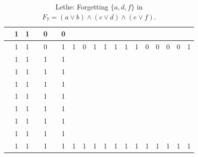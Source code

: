\begin{table}[!tb]
\begin{tabular}{|c|c|c|c|c|c|c|c|c|c|c|c|c|c|c|c|c|c|c|}
        \rowcolor{blue!40}  & 1 & 1 &  & 0 &  & 0 &  &  &  &  &  &  &  &  &  &  &  &  \\ \hline
        \rowcolor{blue!40}  & 1 & 1 &  & 0 &  & 1 & 1 & 0 & 1 & 1 & 1 & 1 & 1 & 0 & 0 & 0 & 0 & 1 \\ \hline
        \rowcolor{red!40}  & 1 & 1 &  & 1 &  & 1 &  &  &  &  &  &  &  &  &  &  &  &  \\ \hline
        \rowcolor{red!40}  & 1 & 1 &  & 1 &  & 1 &  &  &  &  &  &  &  &  &  &  &  &  \\ \hline
        \rowcolor{red!40}  & 1 & 1 &  & 1 &  & 1 &  &  &  &  &  &  &  &  &  &  &  &  \\ \hline
        \rowcolor{red!40}  & 1 & 1 &  & 1 &  & 1 &  &  &  &  &  &  &  &  &  &  &  &  \\ \hline
        \rowcolor{red!40}  & 1 & 1 &  & 1 &  & 1 &  &  &  &  &  &  &  &  &  &  &  &  \\ \hline
        \rowcolor{red!40}  & 1 & 1 &  & 1 &  & 1 &  &  &  &  &  &  &  &  &  &  &  &  \\ \hline
        \rowcolor{red!40}  & 1 & 1 &  & 1 &  & 1 &  &  &  &  &  &  &  &  &  &  &  &  \\ \hline
        \rowcolor{red!40}  & 1 & 1 &  & 1 &  & 1 & 1 & 1 & 1 & 1 & 1 & 1 & 1 & 1 & 1 & 1 & 1 & 1 \\ \hline
    \end{tabular}
    \caption{Lethe: Forgetting $\{a, d, f\}$ in $F_{7} = (a \lor b) \land (c \lor d) \land (e \lor f)$.}
    \label{tab:lethe-F7-adf}
\end{table}
